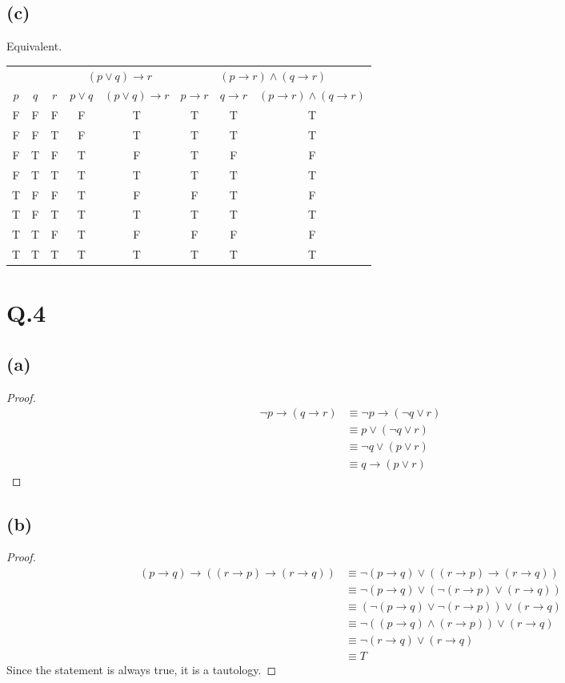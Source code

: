 \documentclass[a4paper,12pt]{article}
\begin{document}
\subsection*{(c)}
Equivalent.
\begin{center}
	\begin{tabular}{cccccccc}
		\toprule
		& & & \multicolumn{2}{c}{$(p \vee q) \to r$} & \multicolumn{3}{c}{$(p \to r) \wedge (q \to r)$}\\
		\cmidrule(lr){4-5} \cmidrule(lr){6-8}
		$p$ & $q$ & $r$ & $p \vee q$ & $(p \vee q)\to r$ & $p \to r$ & $q \to r$ & $(p \to r)\wedge(q \to r)$\\
		\midrule
		F & F & F & F & T & T & T & T\\
		F & F & T & F & T & T & T & T\\
		F & T & F & T & F & T & F & F\\
		F & T & T & T & T & T & T & T\\
		T & F & F & T & F & F & T & F\\
		T & F & T & T & T & T & T & T\\
		T & T & F & T & F & F & F & F\\
		T & T & T & T & T & T & T & T\\
		\bottomrule
	\end{tabular}
\end{center}

\section*{Q.4}

\subsection*{(a)}
\begin{proof}
	\begin{align*}
		\neg p \to (q \to r) &\equiv \neg p \to (\neg q \vee r)\\
		& \equiv p \vee (\neg q \vee r)\\
		& \equiv \neg q \vee (p \vee r)\\
		& \equiv q \to (p \vee r)
	\end{align*}
\end{proof}

\subsection*{(b)}
\begin{proof}
	\begin{align*}
		(p \to q) \to ((r \to p) \to (r \to q)) & \equiv \neg (p \to q) \vee ((r \to p) \to (r \to q))\\
		& \equiv \neg (p \to q) \vee (\neg (r \to p) \vee (r \to q))\\
		& \equiv (\neg (p \to q) \vee \neg (r \to p)) \vee (r \to q)\\
		& \equiv \neg ((p \to q) \wedge (r \to p)) \vee (r \to q)\\
		& \equiv \neg (r \to q) \vee (r \to q)\\
		& \equiv T
	\end{align*}
	Since the statement is always true, it is a tautology.
\end{proof}
\end{document}
